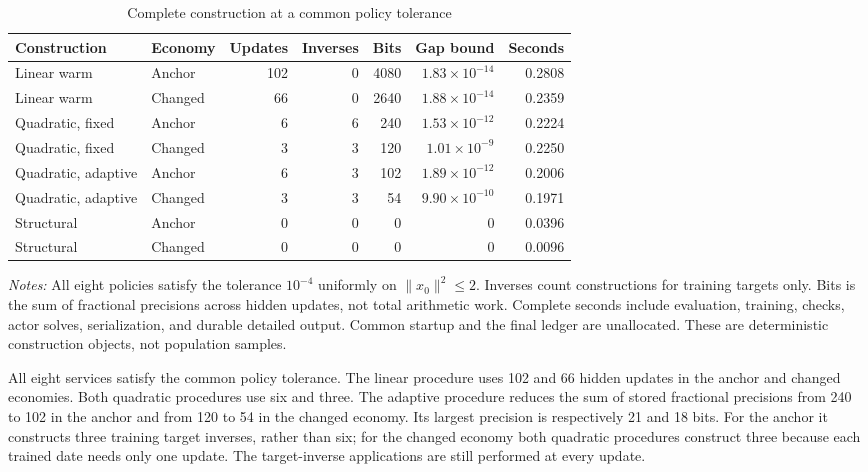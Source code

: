 \documentclass[ecta,nameyear,draft]{econsocart}
\theoremstyle{definition}
\theoremstyle{remark}
\begin{document}
\begin{table}[t]
\centering
\caption{Complete construction at a common policy tolerance}
\label{tab:r37construction}
\small\setlength{\tabcolsep}{3.2pt}
\begin{tabular}{llrrrrr}
\toprule
Construction & Economy & Updates & Inverses & Bits & Gap bound & Seconds\\
\midrule
Linear warm & Anchor & 102 & 0 & 4080 & $1.83\!\times\!10^{-14}$ & 0.2808\\
Linear warm & Changed & 66 & 0 & 2640 & $1.88\!\times\!10^{-14}$ & 0.2359\\
Quadratic, fixed & Anchor & 6 & 6 & 240 & $1.53\!\times\!10^{-12}$ & 0.2224\\
Quadratic, fixed & Changed & 3 & 3 & 120 & $1.01\!\times\!10^{-9}$ & 0.2250\\
Quadratic, adaptive & Anchor & 6 & 3 & 102 & $1.89\!\times\!10^{-12}$ & 0.2006\\
Quadratic, adaptive & Changed & 3 & 3 & 54 & $9.90\!\times\!10^{-10}$ & 0.1971\\
Structural & Anchor & 0 & 0 & 0 & $0$ & 0.0396\\
Structural & Changed & 0 & 0 & 0 & $0$ & 0.0096\\
\bottomrule
\end{tabular}
\par\smallskip\begin{minipage}{0.98\linewidth}\footnotesize
\emph{Notes:} All eight policies satisfy the tolerance $10^{-4}$ uniformly on $\|x_0\|^2\leq2$. Inverses count constructions for training targets only. Bits is the sum of fractional precisions across hidden updates, not total arithmetic work. Complete seconds include evaluation, training, checks, actor solves, serialization, and durable detailed output. Common startup and the final ledger are unallocated. These are deterministic construction objects, not population samples.
\end{minipage}
\end{table}



All eight services satisfy the common policy tolerance. The linear procedure
uses 102 and 66 hidden updates in the anchor and changed economies. Both
quadratic procedures use six and three. The adaptive procedure reduces the
sum of stored fractional precisions from 240 to 102 in the anchor and from
120 to 54 in the changed economy. Its largest precision is respectively
21 and 18 bits. For the anchor it constructs three training target inverses,
rather than six; for the changed economy both quadratic procedures construct
three because each trained date needs only one update. The target-inverse
applications are still performed at every update.
\end{document}
